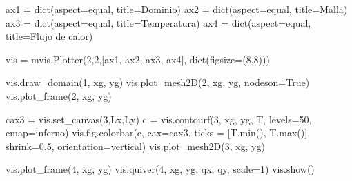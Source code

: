 \documentclass[
  letterpaper,
  DIV=11,
  numbers=noendperiod]{scrreprt}
\newenvironment{Shaded}{\begin{snugshade}}{\end{snugshade}}
\newcommand{\BuiltInTok}[1]{\textcolor[rgb]{0.00,0.23,0.31}{#1}}
\newcommand{\DecValTok}[1]{\textcolor[rgb]{0.68,0.00,0.00}{#1}}
\newcommand{\FloatTok}[1]{\textcolor[rgb]{0.68,0.00,0.00}{#1}}
\newcommand{\NormalTok}[1]{\textcolor[rgb]{0.00,0.23,0.31}{#1}}
\newcommand{\OperatorTok}[1]{\textcolor[rgb]{0.37,0.37,0.37}{#1}}
\newcommand{\StringTok}[1]{\textcolor[rgb]{0.13,0.47,0.30}{#1}}
\newcommand{\VariableTok}[1]{\textcolor[rgb]{0.07,0.07,0.07}{#1}}
\begin{document}
\begin{Shaded}
\begin{Highlighting}[]
\NormalTok{ax1 }\OperatorTok{=} \BuiltInTok{dict}\NormalTok{(aspect}\OperatorTok{=}\StringTok{\textquotesingle{}equal\textquotesingle{}}\NormalTok{, title}\OperatorTok{=}\StringTok{\textquotesingle{}Dominio\textquotesingle{}}\NormalTok{)}
\NormalTok{ax2 }\OperatorTok{=} \BuiltInTok{dict}\NormalTok{(aspect}\OperatorTok{=}\StringTok{\textquotesingle{}equal\textquotesingle{}}\NormalTok{, title}\OperatorTok{=}\StringTok{\textquotesingle{}Malla\textquotesingle{}}\NormalTok{)}
\NormalTok{ax3 }\OperatorTok{=} \BuiltInTok{dict}\NormalTok{(aspect}\OperatorTok{=}\StringTok{\textquotesingle{}equal\textquotesingle{}}\NormalTok{, title}\OperatorTok{=}\StringTok{\textquotesingle{}Temperatura\textquotesingle{}}\NormalTok{)}
\NormalTok{ax4 }\OperatorTok{=} \BuiltInTok{dict}\NormalTok{(aspect}\OperatorTok{=}\StringTok{\textquotesingle{}equal\textquotesingle{}}\NormalTok{, title}\OperatorTok{=}\StringTok{\textquotesingle{}Flujo de calor\textquotesingle{}}\NormalTok{)}

\NormalTok{vis }\OperatorTok{=}\NormalTok{ mvis.Plotter(}\DecValTok{2}\NormalTok{,}\DecValTok{2}\NormalTok{,[ax1, ax2, ax3, ax4],}
                  \BuiltInTok{dict}\NormalTok{(figsize}\OperatorTok{=}\NormalTok{(}\DecValTok{8}\NormalTok{,}\DecValTok{8}\NormalTok{)))}

\NormalTok{vis.draw\_domain(}\DecValTok{1}\NormalTok{, xg, yg)}
\NormalTok{vis.plot\_mesh2D(}\DecValTok{2}\NormalTok{, xg, yg, nodeson}\OperatorTok{=}\VariableTok{True}\NormalTok{)}
\NormalTok{vis.plot\_frame(}\DecValTok{2}\NormalTok{, xg, yg)}

\NormalTok{cax3 }\OperatorTok{=}\NormalTok{ vis.set\_canvas(}\DecValTok{3}\NormalTok{,Lx,Ly)}
\NormalTok{c }\OperatorTok{=}\NormalTok{ vis.contourf(}\DecValTok{3}\NormalTok{, xg, yg, T, levels}\OperatorTok{=}\DecValTok{50}\NormalTok{, cmap}\OperatorTok{=}\StringTok{\textquotesingle{}inferno\textquotesingle{}}\NormalTok{)}
\NormalTok{vis.fig.colorbar(c, cax}\OperatorTok{=}\NormalTok{cax3, ticks }\OperatorTok{=}\NormalTok{ [T.}\BuiltInTok{min}\NormalTok{(), T.}\BuiltInTok{max}\NormalTok{()], shrink}\OperatorTok{=}\FloatTok{0.5}\NormalTok{, orientation}\OperatorTok{=}\StringTok{\textquotesingle{}vertical\textquotesingle{}}\NormalTok{)}
\NormalTok{vis.plot\_mesh2D(}\DecValTok{3}\NormalTok{, xg, yg)}

\NormalTok{vis.plot\_frame(}\DecValTok{4}\NormalTok{, xg, yg)}
\NormalTok{vis.quiver(}\DecValTok{4}\NormalTok{, xg, yg, qx, qy, scale}\OperatorTok{=}\DecValTok{1}\NormalTok{)}
\NormalTok{vis.show()}
\end{Highlighting}
\end{Shaded}
\end{document}
